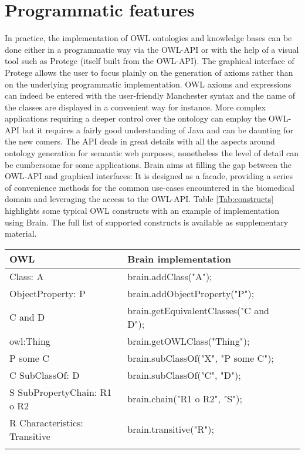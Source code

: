 \documentclass{bioinfo}
\begin{document}
\section{Programmatic features}
In practice, the implementation of OWL ontologies and knowledge bases can be done either in a programmatic way via the OWL-API or with the
help of a visual tool such as Protege (itself built from the OWL-API). The graphical interface of Protege allows the user to focus 
plainly on the generation of axioms rather than on the underlying programmatic implementation. 
OWL axioms and expressions can indeed be entered 
with the user-friendly Manchester syntax and the name of the classes are displayed in a convenient way for instance. 
More complex applications requiring a deeper control over the ontology
can employ the OWL-API but it requires a fairly good understanding of Java and can be daunting for the new comers.
The API deals in great details with all the aspects around ontology generation for semantic web purposes, nonetheless the level of detail 
can be cumbersome for some applications. Brain aims at filling the gap between the OWL-API
and graphical interfaces: It is designed as a facade, providing a series of convenience methods for the common
use-cases encountered in the biomedical domain and leveraging the access to the OWL-API. 
Table \ref{Tab:constructs} highlights some typical OWL constructs 
with an example of implementation using Brain. The full list of supported constructs is available as supplementary material.
\begin{table}[!h]
{\begin{tabular}{llll}\toprule
OWL & Brain implementation\\\midrule
Class: A & brain.addClass("A");\\
ObjectProperty: P & brain.addObjectProperty("P");\\
C and D & brain.getEquivalentClasses("C and D");\\
owl:Thing & brain.getOWLClass("Thing");\\
P some C & brain.subClassOf("X", "P some C");\\
C SubClassOf: D & brain.subClassOf("C", "D");\\
S SubPropertyChain: R1 o R2 & brain.chain("R1 o R2", "S");\\
R Characteristics: Transitive & brain.transitive("R");\\\botrule
\end{tabular}}{}
\end{table}
\end{document}
